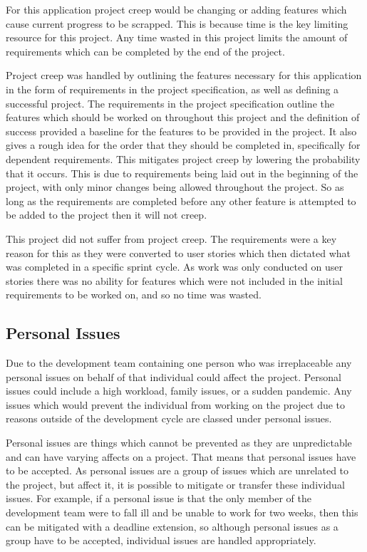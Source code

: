 \documentclass{article}
\begin{document}
For this application project creep would be changing or adding features which cause current progress to be scrapped. This is because time is the key limiting resource for this project. Any time wasted in this project limits the amount of requirements which can be completed by the end of the project. \par

Project creep was handled by outlining the features necessary for this application in the form of requirements in the project specification, as well as defining a successful project. The requirements in the project specification outline the features which should be worked on throughout this project and the definition of success provided a baseline for the features to be provided in the project. It also gives a rough idea for the order that they should be completed in, specifically for dependent requirements. This mitigates project creep by lowering the probability that it occurs. This is due to requirements being laid out in the beginning of the project, with only minor changes being allowed throughout the project. So as long as the requirements are completed before any other feature is attempted to be added to the project then it will not creep. \par

This project did not suffer from project creep. The requirements were a key reason for this as they were converted to user stories which then dictated what was completed in a specific sprint cycle. As work was only conducted on user stories there was no ability for features which were not included in the initial requirements to be worked on, and so no time was wasted. \par

\subsection{Personal Issues}

Due to the development team containing one person who was irreplaceable any personal issues on behalf of that individual could affect the project. Personal issues could include a high workload, family issues, or a sudden pandemic. Any issues which would prevent the individual from working on the project due to reasons outside of the development cycle are classed under personal issues. \par

Personal issues are things which cannot be prevented as they are unpredictable and can have varying affects on a project. That means that personal issues have to be accepted. As personal issues are a group of issues which are unrelated to the project, but affect it, it is possible to mitigate or transfer these individual issues. For example, if a personal issue is that the only member of the development team were to fall ill and be unable to work for two weeks, then this can be mitigated with a deadline extension, so although personal issues as a group have to be accepted, individual issues are handled appropriately. \par
\end{document}
